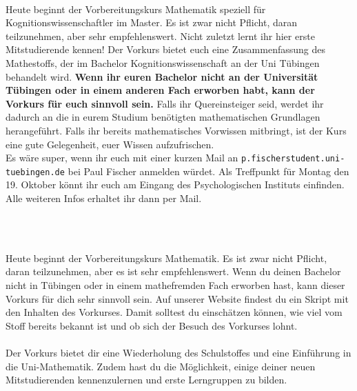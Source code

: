 \begin{description}


\ifkogwiss
    \ifmaster
        \item[Montag, 19. Oktober \YEAR, 08:00 Uhr, Ort Psychologisches Institut 4.332 und 4.326]\ \\
        Heute beginnt der Vorbereitungskurs Mathematik speziell für Kognitionswissenschaftler im Master. Es ist zwar nicht Pflicht, daran teilzunehmen, aber sehr empfehlenswert. Nicht zuletzt lernt ihr hier erste Mitstudierende kennen! Der Vorkurs bietet euch eine Zusammenfassung des Mathestoffs, der im Bachelor Kognitionswissenschaft an der Uni Tübingen behandelt wird.
        \textbf{Wenn ihr euren Bachelor nicht an der Universität Tübingen oder in einem anderen Fach erworben habt, kann der Vorkurs für euch sinnvoll sein.} Falls ihr Quereinsteiger seid, werdet ihr dadurch an die in eurem Studium benötigten mathematischen Grundlagen herangeführt. Falls ihr bereits mathematisches Vorwissen mitbringt, ist der Kurs eine gute Gelegenheit, euer Wissen aufzufrischen.\\
         Es wäre super, wenn ihr euch mit einer kurzen Mail an \texttt{p.fischer\At student.uni-tuebingen.de} bei Paul Fischer anmelden würdet. Als Treffpunkt für Montag den 19. Oktober könnt ihr euch am Eingang des Psychologischen Instituts einfinden. Alle weiteren Infos erhaltet ihr dann per Mail.\\

%
%
    \fi
\fi

\ifml
	\item~ %
\else
    \item[Mathevorkurs - \mathedatum~\YEAR]~\\
    \ifbachelor
    Heute beginnt der Vorbereitungskurs Mathematik. Es ist zwar nicht Pflicht, daran teilzunehmen, aber es ist sehr empfehlenswert.
    \fi
    \ifmaster
    Wenn du deinen Bachelor nicht in Tübingen oder in einem mathefremden Fach erworben hast, kann dieser Vorkurs für dich sehr sinnvoll sein. Auf unserer Website findest du ein Skript mit den Inhalten des Vorkurses. Damit solltest du einschätzen können, wie viel vom Stoff bereits bekannt ist und ob sich der Besuch des Vorkurses lohnt.\\\\
    \fi
	Der Vorkurs bietet dir eine Wiederholung des Schulstoffes und eine Einführung in die Uni-Mathematik. Zudem hast du die Möglichkeit, einige deiner neuen Mitstudierenden kennenzulernen und erste Lerngruppen zu bilden.
	

\end{description}
